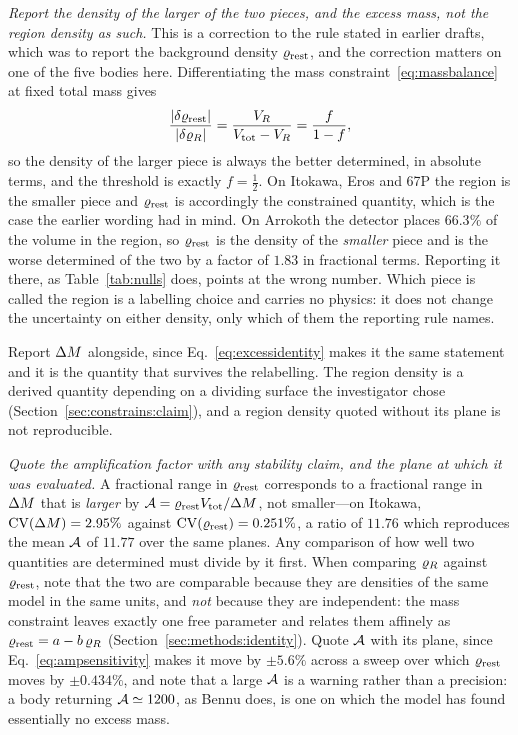 \emph{Report the density of the larger of the two pieces, and the excess
mass, not the region density as such.} This is a correction to the rule
stated in earlier drafts, which was to report the background density
$\varrho_{\mathrm{rest}}$, and the correction matters on one of the five bodies here.
Differentiating the mass constraint~\eqref{eq:massbalance} at fixed total
mass gives
%
\begin{equation}
\frac{\lvert\delta\varrho_{\mathrm{rest}}\rvert}{\lvert\delta\varrho_{R}\rvert}
 = \frac{V_{R}}{V_{\mathrm{tot}}-V_{R}} = \frac{f}{1-f} ,
\label{eq:whichpiece}
\end{equation}
%
so the density of the larger piece is always the better determined, in
absolute terms, and the threshold is exactly $f = \tfrac{1}{2}$. On Itokawa,
Eros and 67P the region is the smaller piece and $\varrho_{\mathrm{rest}}$ is accordingly
the constrained quantity, which is the case the earlier wording had in mind.
On Arrokoth the detector places $66.3\%$ of the volume in the region, so
$\varrho_{\mathrm{rest}}$ is the density of the \emph{smaller} piece and is the worse
determined of the two by a factor of $1.83$ in fractional terms. Reporting
it there, as Table~\ref{tab:nulls} does, points at the wrong number. Which
piece is called the region is a labelling choice and carries no physics: it
does not change the uncertainty on either density, only which of them the
reporting rule names.

Report $\Delta M$ alongside, since Eq.~\eqref{eq:excessidentity} makes it the
same statement and it is the quantity that survives the relabelling. The
region density is a derived quantity depending on a dividing surface the
investigator chose (Section~\ref{sec:constrains:claim}), and a region
density quoted without its plane is not reproducible.

\emph{Quote the amplification factor with any stability claim, and the plane
at which it was evaluated.} A fractional range in $\varrho_{\mathrm{rest}}$ corresponds to
a fractional range in $\Delta M$ that is \emph{larger} by
$\mathcal{A} = \varrho_{\mathrm{rest}}V_{\mathrm{tot}}/\Delta M$, not smaller---on Itokawa,
$\mathrm{CV}(\Delta M)=2.95\%$ against $\mathrm{CV}(\varrho_{\mathrm{rest}})=0.251\%$, a ratio of $11.76$
which reproduces the mean $\mathcal{A}$ of $11.77$ over the same planes. Any
comparison of how well two quantities are determined must divide by it
first. When comparing $\varrho_{R}$ against $\varrho_{\mathrm{rest}}$, note that the two are
comparable because they are densities of the same model in the same units,
and \emph{not} because they are independent: the mass constraint leaves
exactly one free parameter and relates them affinely as
$\varrho_{\mathrm{rest}} = a - b\,\varrho_{R}$ (Section~\ref{sec:methods:identity}). Quote
$\mathcal{A}$ with its plane, since Eq.~\eqref{eq:ampsensitivity} makes it move
by $\pm5.6\%$ across a sweep over which $\varrho_{\mathrm{rest}}$ moves by $\pm0.434\%$,
and note that a large $\mathcal{A}$ is a warning rather than a precision: a body
returning $\mathcal{A}\simeq1200$, as Bennu does, is one on which the model has
found essentially no excess mass.

